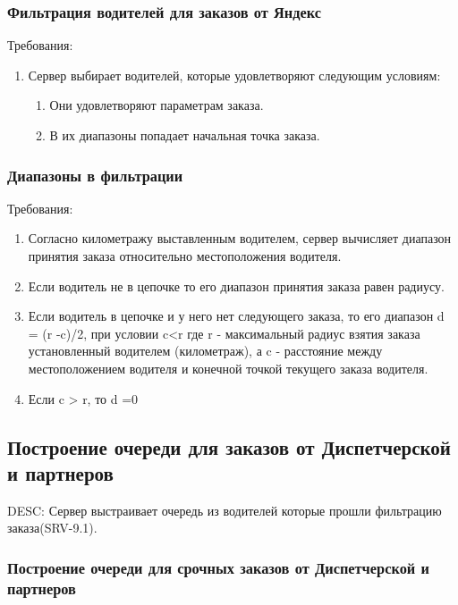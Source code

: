 		\subsubsection{Фильтрация водителей для заказов от Яндекс}

			Требования:

			\begin{enumerate}
				\item{Сервер выбирает водителей, которые удовлетворяют следующим условиям: \begin{enumerate}[label*=\arabic*.] \item{Они удовлетворяют параметрам заказа.} \item{В их диапазоны попадает начальная точка заказа.} \end{enumerate}}
			\end{enumerate}

		\subsubsection{Диапазоны в фильтрации}

			Требования:

			\begin{enumerate}
				\item{Согласно километражу выставленным водителем, сервер вычисляет диапазон принятия заказа относительно местоположения водителя.}

				\item{Если водитель не в цепочке то его диапазон принятия заказа равен радиусу.}

				\item{Если водитель в цепочке и у него нет следующего заказа, то его диапазон d = (r -c)/2, при условии c<r где r - максимальный радиус взятия заказа установленный водителем (километраж), а c - расстояние между местоположением водителя и конечной точкой текущего заказа водителя.}

				\item{Если c > r, то d =0}
			\end{enumerate}

	\subsection{Построение очереди для заказов от Диспетчерской и партнеров}

		DESC: Сервер выстраивает очередь из водителей которые прошли фильтрацию заказа(SRV-9.1).

		\subsubsection{Построение очереди для срочных заказов от Диспетчерской и партнеров}

